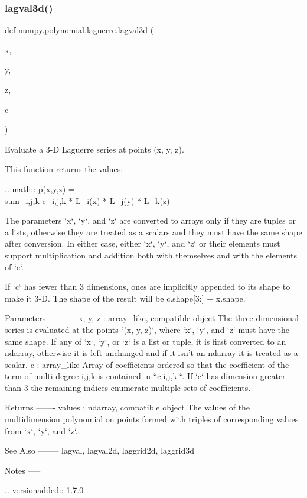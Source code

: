 \subsubsection{\texorpdfstring{lagval3d()}{lagval3d()}}
{\footnotesize\ttfamily def numpy.\+polynomial.\+laguerre.\+lagval3d (\begin{DoxyParamCaption}\item[{}]{x,  }\item[{}]{y,  }\item[{}]{z,  }\item[{}]{c }\end{DoxyParamCaption})}

\begin{DoxyVerb}Evaluate a 3-D Laguerre series at points (x, y, z).

This function returns the values:

.. math:: p(x,y,z) = \\sum_{i,j,k} c_{i,j,k} * L_i(x) * L_j(y) * L_k(z)

The parameters `x`, `y`, and `z` are converted to arrays only if
they are tuples or a lists, otherwise they are treated as a scalars and
they must have the same shape after conversion. In either case, either
`x`, `y`, and `z` or their elements must support multiplication and
addition both with themselves and with the elements of `c`.

If `c` has fewer than 3 dimensions, ones are implicitly appended to its
shape to make it 3-D. The shape of the result will be c.shape[3:] +
x.shape.

Parameters
----------
x, y, z : array_like, compatible object
    The three dimensional series is evaluated at the points
    `(x, y, z)`, where `x`, `y`, and `z` must have the same shape.  If
    any of `x`, `y`, or `z` is a list or tuple, it is first converted
    to an ndarray, otherwise it is left unchanged and if it isn't an
    ndarray it is  treated as a scalar.
c : array_like
    Array of coefficients ordered so that the coefficient of the term of
    multi-degree i,j,k is contained in ``c[i,j,k]``. If `c` has dimension
    greater than 3 the remaining indices enumerate multiple sets of
    coefficients.

Returns
-------
values : ndarray, compatible object
    The values of the multidimension polynomial on points formed with
    triples of corresponding values from `x`, `y`, and `z`.

See Also
--------
lagval, lagval2d, laggrid2d, laggrid3d

Notes
-----

.. versionadded:: 1.7.0\end{DoxyVerb}
 \mbox{\label{namespacenumpy_1_1polynomial_1_1laguerre_afacaffe8b7ed724f079e00f647a20a56}} 
